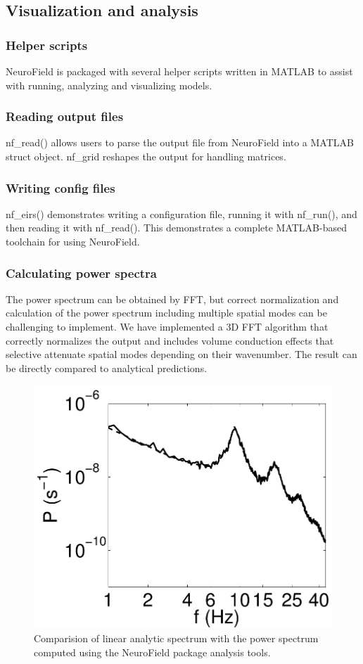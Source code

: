 \documentclass[preprint,review,10pt,authoryear,letterpaper]{elsarticle}
\begin{document}
\subsection{Visualization and analysis}

\subsubsection{Helper scripts}
NeuroField is packaged with several helper scripts written in MATLAB to assist with running, analyzing and visualizing models. 

\subsubsection{Reading output files}
nf\_read() allows users to parse the output file from NeuroField into a MATLAB struct object.
nf\_grid reshapes the output for handling matrices. 

\subsubsection{Writing config files}
nf\_eirs() demonstrates writing a configuration file, running it with nf\_run(), and then reading it with nf\_read(). This demonstrates a complete MATLAB-based toolchain for using NeuroField.

\subsubsection{Calculating power spectra}
The power spectrum can be obtained by FFT, but correct normalization and calculation of the power spectrum including multiple spatial modes can be challenging to implement. We have implemented a 3D FFT algorithm that correctly normalizes the output and includes volume conduction effects that selective attenuate spatial modes depending on their wavenumber. The result can be directly compared to analytical predictions.

\begin{figure}[!b]
\begin{center}
\includegraphics[width=0.80\columnwidth]{corticothalamic_comparison}
\caption{Comparision of linear analytic spectrum with the power spectrum computed using the NeuroField package analysis tools.}
\label{fig:ct_spectrum}
\end{center}
\end{figure}
\end{document}

